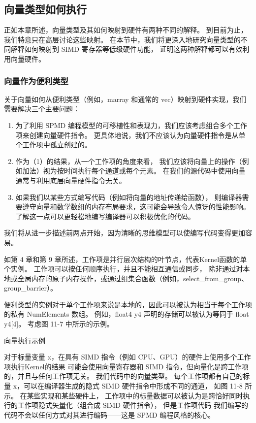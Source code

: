 \subsection{向量类型如何执行}
正如本章所述，向量类型及其如何映射到硬件有两种不同的解释。 到目前为止，我们特意只在高层讨论这些映射。 
在本节中，我们将更深入地研究向量类型的不同解释如何映射到 SIMD 寄存器等低级硬件功能，
证明这两种解释都可以有效利用向量硬件。

\subsubsection{向量作为便利类型}
关于向量如何从便利类型（例如，marray 和通常的 vec）映射到硬件实现，我们需要解决三个主要问题：

\begin{enumerate}
	\item 为了利用 SPMD 编程模型的可移植性和表现力，我们应该考虑组合多个工作项来创建向量硬件指令。 
	更具体地说，我们不应该认为向量硬件指令是从单个工作项中孤立创建的。

	\item 作为（1）的结果，从一个工作项的角度来看，
	我们应该将向量上的操作（例如加法）视为按时间执行每个通道或每个元素。 
	在我们的源代码中使用向量通常与利用底层向量硬件指令无关。

	\item 如果我们以某些方式编写代码（例如将向量的地址传递给函数），
	则编译器需要遵守向量和数学数组的内存布局要求，这可能会导致令人惊讶的性能影响。 
	了解这一点可以更轻松地编写编译器可以积极优化的代码。
\end{enumerate}

我们将从进一步描述前两点开始，因为清晰的思维模型可以使编写代码变得更加容易。

如第 4 章和第 9 章所述，工作项是并行层次结构的叶节点，代表Kernel函数的单个实例。 
工作项可以按任何顺序执行，并且不能相互通信或同步，
除非通过对本地或全局内存的原子内存操作，或通过组集合函数（例如，select\_from\_group、group\_barrier）。

便利类型的实例对于单个工作项来说是本地的，因此可以被认为相当于每个工作项的私有 NumElements 数组。 
例如，float4 y4 声明的存储可以被认为等同于 float y4[4]。 考虑图 11-7 中所示的示例。

{\color{red} 向量执行示例}

对于标量变量 x，在具有 SIMD 指令（例如 CPU、GPU）的硬件上使用多个工作项执行Kernel的结果
可能会使用向量寄存器和 SIMD 指令，但向量化是跨工作项的，并且与任何工作项无关。 
我们代码中的向量类型。 每个工作项都有自己的标量 x，可以在编译器生成的隐式 SIMD 硬件指令中形成不同的通道，
如图 11-8 所示。 在某些实现和某些硬件上，
工作项中的标量数据可以被认为是跨恰好同时执行的工作项隐式矢量化（组合成 SIMD 硬件指令），
但是工作项代码 我们编写的代码不会以任何方式对其进行编码——这是 SPMD 编程风格的核心。

